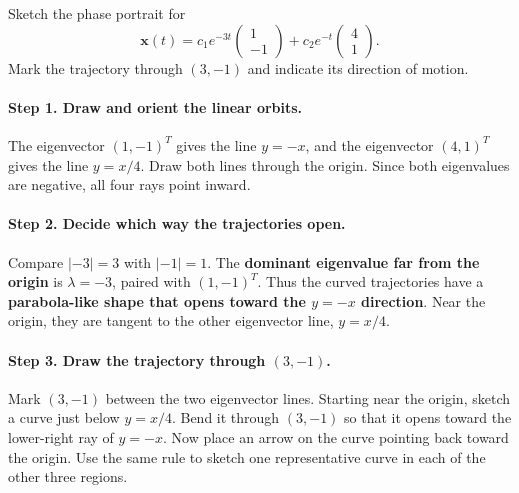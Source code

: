 \documentclass[10pt,letterpaper]{article}
\begin{document}
\begin{example}[2]{
Sketch the phase portrait for
\[
    \mathbf{x}(t)
    =c_1e^{-3t}\begin{pmatrix}1\\-1\end{pmatrix}
    +c_2e^{-t}\begin{pmatrix}4\\1\end{pmatrix}.
\]
Mark the trajectory through $(3,-1)$ and indicate its direction of motion.
}

\paragraph{Step 1. Draw and orient the linear orbits.}
The eigenvector $(1,-1)^T$ gives the line $y=-x$, and the eigenvector
$(4,1)^T$ gives the line $y=x/4$. Draw both lines through the origin.
Since both eigenvalues are negative, all four rays point inward.

\paragraph{Step 2. Decide which way the trajectories open.}
Compare $|-3|=3$ with $|-1|=1$. The \textbf{dominant eigenvalue far
from the origin} is $\lambda=-3$, paired with $(1,-1)^T$. Thus the
curved trajectories have a \textbf{parabola-like shape that opens
toward the $y=-x$ direction}. Near the origin, they are tangent to
the other eigenvector line, $y=x/4$.

\paragraph{Step 3. Draw the trajectory through $(3,-1)$.}
Mark $(3,-1)$ between the two eigenvector lines. Starting near the
origin, sketch a curve just below $y=x/4$. Bend it through $(3,-1)$
so that it opens toward the lower-right ray of $y=-x$. Now place an
arrow on the curve pointing back toward the origin. Use the same rule
to sketch one representative curve in each of the other three regions.

\begin{center}
\end{center}
\end{example}
\end{document}
